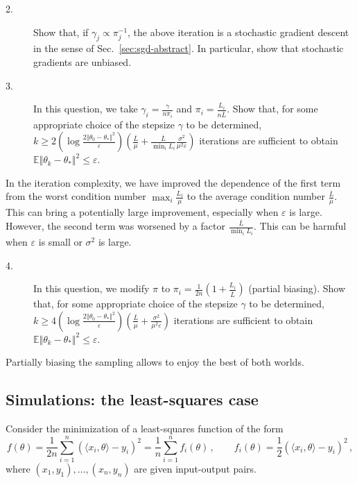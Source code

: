 \documentclass[11pt,reqno]{article}
\newcommand{\E}{\mathbb{E}}
\renewcommand{\leq}{\leqslant}
\renewcommand{\geq}{\geqslant}
\numberwithin{equation}{section}
\theoremstyle{plain}
\theoremstyle{definition}
\theoremstyle{remark}
\begin{document}
\begin{description}
	\item[2.] Show that, if $\gamma_j \propto \pi_j^{-1}$, the above iteration is a stochastic gradient descent in the sense of Sec.~\ref{sec:sgd-abstract}. In particular, show that stochastic gradients are unbiased.
	

	\item[3.] In this question, we take $\gamma_i = \frac{\gamma}{n\pi_i}$ and $\pi_i = \frac{L_i}{n\overline{L}}$. Show that, for some appropriate choice of the stepsize $\gamma$ to be determined, $k \geq 2\left(\log \frac{2\Vert \theta_0 - \theta_* \Vert^2}{\varepsilon}\right) \left(\frac{\overline{L}}{\mu} + \frac{\overline{L}}{\min_i L_i}\frac{\sigma^2}{\mu^2 \varepsilon}\right)$ iterations are sufficient to obtain $\E\Vert \theta_k - \theta_* \Vert^2 \leq \varepsilon$.
\end{description}
In the iteration complexity, we have improved the dependence of the first term from the worst condition number $\max_i \frac{L_i}{\mu}$ to the average condition number $\frac{\overline{L}}{\mu}$. This can bring a potentially large improvement, especially when $\varepsilon$ is large. However, the second term was worsened by a factor $\frac{\overline{L}}{\min_i L_i}$. This can be harmful when $\varepsilon$ is small or $\sigma^2$ is large. 

\begin{description}
	\item[4.] In this question, we modify $\pi$ to $\pi_i = \frac{1}{2n} \left(1 + \frac{L_i}{\overline{L}}\right)$ (partial biasing). Show that, for some appropriate choice of the stepsize $\gamma$ to be determined, 
	$k \geq 4\left(\log \frac{2\Vert \theta_0 - \theta_* \Vert^2}{\varepsilon}\right) \left(\frac{\overline{L}}{\mu} + \frac{\sigma^2}{\mu^2 \varepsilon}\right)$ iterations are sufficient to obtain $\E\Vert \theta_k - \theta_* \Vert^2 \leq \varepsilon$.
\end{description}
Partially biasing the sampling allows to enjoy the best of both worlds. 

\subsection{Simulations: the least-squares case}

Consider the minimization of a least-squares function of the form 
\begin{equation*}
	f(\theta) = \frac{1}{2n} \sum_{i=1}^{n} \left(\langle x_i, \theta \rangle - y_i\right)^2 = \frac{1}{n }\sum_{i=1}^{n} f_i(\theta)\, , \qquad f_i(\theta) = \frac{1}{2 } \left(\langle x_i, \theta\rangle - y_i\right)^2 \, ,
\end{equation*}
where $(x_1,y_1), \dots, (x_n, y_n)$ are given input-output pairs.
\end{document}
